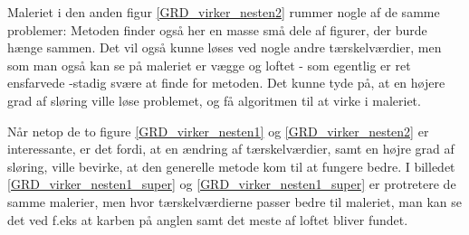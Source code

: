 Maleriet i den anden figur \ref{GRD_virker_nesten2} rummer nogle af de
samme problemer: Metoden finder også her en masse små dele af figurer,
der burde hænge sammen. Det vil også kunne løses ved nogle andre
tærskelværdier, men som man også kan se på maleriet er vægge og loftet -
som egentlig er ret ensfarvede -stadig svære at finde for metoden. Det
kunne tyde på, at en højere grad af sløring ville løse problemet, og få
algoritmen til at virke i maleriet.

Når netop de to figure \ref{GRD_virker_nesten1} og
\ref{GRD_virker_nesten2} er interessante, er det fordi, at en ændring af
tærskelværdier, samt en højre grad af sløring, ville bevirke, at den
generelle metode kom til at fungere bedre. I billedet
\ref{GRD_virker_nesten1_super} og \ref{GRD_virker_nesten1_super} er
protretere de samme malerier, men hvor tærskelværdierne passer bedre til
maleriet, man kan se det ved f.eks at karben på anglen samt det meste af
loftet bliver fundet.

\clearpage

